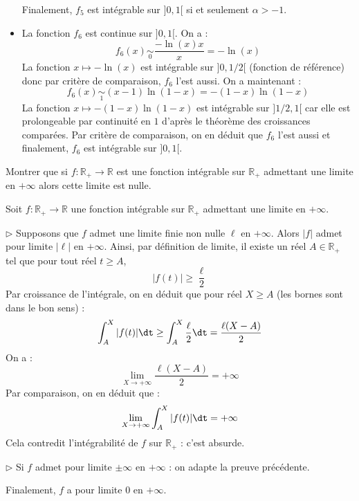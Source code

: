 \documentclass[a4paper,10pt]{report}
\begin{document}
\begin{itemize}
\medskip

\noindent Finalement, $f_5$ est intégrable sur $]0,1[$ si et seulement $\alpha>-1$.
 \item La fonction $f_6$ est continue sur $]0,1[$. On a :
 $$f_6(x) \underset{0}{\sim} \dfrac{- \ln(x) x}{x} = - \ln(x)$$
 La fonction $x \mapsto - \ln(x)$ est intégrable sur $]0,1/2[$ (fonction de référence) donc par critère de comparaison, $f_6$ l'est aussi. On a maintenant :
 $$ f_6(x) \underset{1}{\sim} (x-1) \ln(1-x) = - (1-x)\ln(1-x)$$
 La fonction $x \mapsto -(1-x)\ln(1-x)$ est intégrable sur $]1/2,1[$ car elle est prolongeable par continuité en $1$ d'après le théorème des croissances comparées. Par critère de comparaison, on en déduit que $f_6$ l'est aussi et finalement, $f_6$ est intégrable sur $]0,1[$.
\end{itemize}

\begin{Exercice}{} Montrer que si $f : \mathbb{R}_+ \rightarrow \mathbb{R}$ est une fonction intégrable sur $\mathbb{R}_+$ admettant une limite en $+ \infty$ alors cette limite est nulle. 
\end{Exercice} 

\corr Soit $f : \mathbb{R}_+ \rightarrow \mathbb{R}$ une fonction intégrable sur $\mathbb{R}_+$ admettant une limite en $+ \infty$. 

\medskip

\noindent $\rhd$ Supposons que $f$ admet une limite finie non nulle $\ell$ en $+ \infty$. Alors $\vert f \vert $ admet pour limite $\vert \ell \vert$ en $+ \infty$. Ainsi, par définition de limite, il existe un réel $A \in \mathbb{R}_+$ tel que pour tout réel $t \geq A$,
$$ \vert f(t) \vert \geq \dfrac{\ell}{2}$$
Par croissance de l'intégrale, on en déduit que pour réel $X \geq A$ (les bornes sont dans le bon sens) : 
$$ \int_A^{X} \vert f(t) \vert \dt \geq \int_A^{X} \dfrac{\ell}{2} \dt = \dfrac{\ell(X-A)}{2}$$
On a :
$$ \lim_{X \rightarrow + \infty} \dfrac{\ell(X-A)}{2} = + \infty$$
Par comparaison, on en déduit que :
$$  \lim_{X \rightarrow + \infty} \int_A^{X} \vert f(t) \vert \dt = + \infty$$
Cela contredit l'intégrabilité de $f$ sur $\mathbb{R}_+$ : c'est absurde.

\medskip

\noindent $\rhd$ Si $f$ admet pour limite $\pm \infty$ en $+ \infty$ : on adapte la preuve précédente.

\medskip

\noindent Finalement, $f$ a pour limite $0$ en $+ \infty$.
\end{document}
